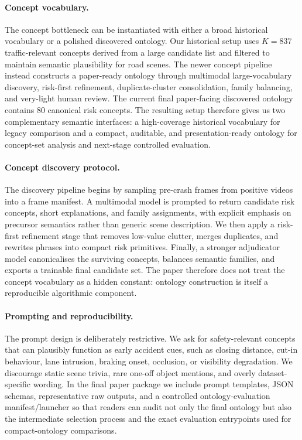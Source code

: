 \paragraph{Concept vocabulary.}
The concept bottleneck can be instantiated with either a broad historical
vocabulary or a polished discovered ontology. Our historical setup uses
$K{=}837$ traffic-relevant concepts derived from a large candidate list and
filtered to maintain semantic plausibility for road scenes. The newer concept
pipeline instead constructs a paper-ready ontology through multimodal
large-vocabulary discovery, risk-first refinement, duplicate-cluster
consolidation, family balancing, and very-light human review. The current final
paper-facing discovered ontology contains 80 canonical risk concepts. The
resulting setup therefore gives us two complementary semantic interfaces: a
high-coverage historical vocabulary for legacy comparison and a compact,
auditable, and presentation-ready ontology for concept-set analysis and
next-stage controlled evaluation.

\paragraph{Concept discovery protocol.}
The discovery pipeline begins by sampling pre-crash frames from positive videos
into a frame manifest. A multimodal model is prompted to return candidate risk
concepts, short explanations, and family assignments, with explicit emphasis on
precursor semantics rather than generic scene description. We then apply a
risk-first refinement stage that removes low-value clutter, merges duplicates,
and rewrites phrases into compact risk primitives. Finally, a stronger
adjudicator model canonicalises the surviving concepts, balances semantic
families, and exports a trainable final candidate set. The paper therefore does
not treat the concept vocabulary as a hidden constant: ontology construction is
itself a reproducible algorithmic component.

\paragraph{Prompting and reproducibility.}
The prompt design is deliberately restrictive. We ask for safety-relevant
concepts that can plausibly function as early accident cues, such as closing
distance, cut-in behaviour, lane intrusion, braking onset, occlusion, or
visibility degradation. We discourage static scene trivia, rare one-off object
mentions, and overly dataset-specific wording. In the final paper package we
include prompt templates, JSON schemas, representative raw outputs, and a
controlled ontology-evaluation manifest/launcher so that readers can audit not
only the final ontology but also the intermediate selection process and the
exact evaluation entrypoints used for compact-ontology comparisons.

